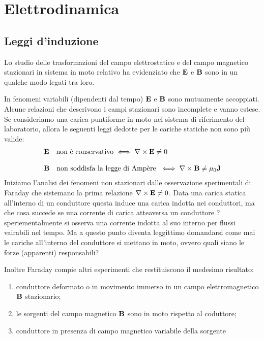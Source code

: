 \setcounter{chapter}{4}
\chapter{Elettrodinamica}

\section{Leggi d'induzione}

Lo studio delle trasformazioni del campo elettrostatico e del campo magnetico stazionari in sistema in moto relativo ha evidenziato che $\bold{E}$ e $\bold{B}$ sono in un qualche modo legati tra loro.

In fenomeni variabili (dipendenti dal tempo) $\bold{E}$ e $\bold{B}$ sono mutuamente accoppiati. Alcune relazioni che descrivono i campi stazionari sono incomplete e vanno estese.
Se consideriamo una carica puntiforme in moto nel sistema di riferimento del laboratorio, allora le seguenti leggi dedotte per le cariche statiche non sono pi\`u valide:
\begin{align*}
	& \bold{E} \quad \text{non \`e conservativo} \iff \nabla \times \bold{E} \neq 0 \\[0.3cm]
	& \bold{B} \quad \text{non soddisfa la legge di Amp\`ere } \iff \nabla \times \bold{B} \neq \mu_0 \bold{J}
\end{align*}
Iniziamo l'analisi dei fenomeni non stazionari dalle osservazione sperimentali di Faraday che sistemano la prima relazione $\nabla \times \bold{E} \neq 0$.  Data una carica statica all'interno di un conduttore 
questa induce una carica indotta nei conduttori, ma che cosa succede se una corrente di carica atteaversa un conduttore ? speriementalmente si osserva una corrente indotta al suo interno per flussi vairabili nel tempo. Ma a questo punto diventa 
leggittimo domandarsi come mai le cariche all'interno del conduttore si mettano in moto, ovvero quali siano le forze (apparenti) responsabili?

Inoltre Faraday compie altri esperimenti che restituiscono il medesimo risultato:
\begin{enumerate}
	\item conduttore deformato o in movimento immerso in un campo elettromagnetico $\bold{B}$ stazionario;
	\item le sorgenti del campo magnetico $\bold{B}$ sono in moto rispetto al coduttore;
	\item conduttore in presenza di campo magnetico variabile della sorgente
\end{enumerate}

